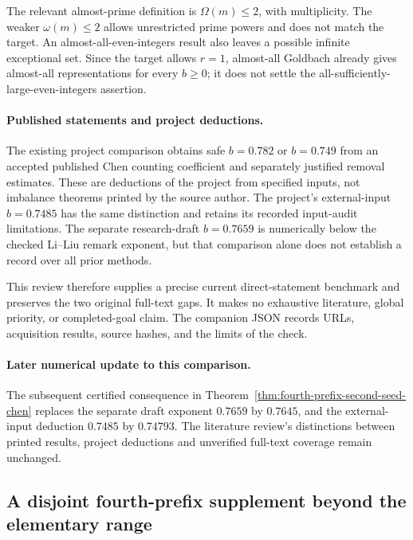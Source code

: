 \documentclass[11pt]{article}
\begin{document}
The relevant almost-prime definition is \(\Omega(m)\le2\), with
multiplicity. The weaker \(\omega(m)\le2\) allows unrestricted prime
powers and does not match the target. An almost-all-even-integers
result also leaves a possible infinite exceptional set.
Since the target allows \(r=1\), almost-all Goldbach already gives
almost-all representations for every \(b\ge0\); it does not settle
the all-sufficiently-large-even-integers assertion.

\paragraph{Published statements and project deductions.}
The existing project comparison obtains safe \(b=0.782\) or
\(b=0.749\) from an accepted published Chen counting coefficient
and separately justified removal estimates.
These are deductions of the project from specified inputs, not
imbalance theorems printed by the source author.
The project's external-input \(b=0.7485\) has the same distinction
and retains its recorded input-audit limitations.
The separate research-draft \(b=0.7659\) is numerically below the
checked Li--Liu remark exponent, but that comparison alone does
not establish a record over all prior methods.

This review therefore supplies a precise current direct-statement
benchmark and preserves the two original full-text gaps.
It makes no exhaustive literature, global priority, or completed-goal
claim. The companion JSON records URLs, acquisition results,
source hashes, and the limits of the check.


\paragraph{Later numerical update to this comparison.}
The subsequent certified consequence in
Theorem~\ref{thm:fourth-prefix-second-seed-chen} replaces the separate
draft exponent $0.7659$ by $0.7645$, and the external-input deduction
$0.7485$ by $0.74793$. The literature review's distinctions between
printed results, project deductions and unverified full-text coverage
remain unchanged.

\subsection{A disjoint fourth-prefix supplement beyond the elementary range}
\label{sec:fourth-prefix-tail-refinement}
\end{document}
